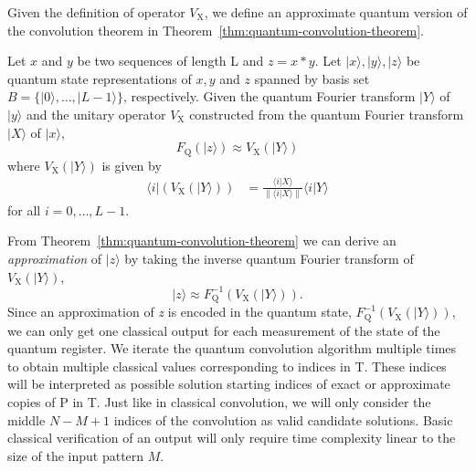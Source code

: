 Given the definition of operator $V_{\mathrm{X}}$, we define an approximate quantum version of the convolution theorem in Theorem~\ref{thm:quantum-convolution-theorem}.

\begin{theorem}\label{thm:quantum-convolution-theorem}
	Let $x$ and $y$ be two sequences of length L and $z = x \ast y$. Let $\vert x \rangle, \vert y \rangle, \vert z \rangle$ be quantum state representations of $x, y$ and $z$ spanned by basis set $B=\{\vert 0 \rangle,\ldots,\vert L-1 \rangle\}$, respectively. Given the quantum Fourier transform $\vert Y \rangle$ of $\vert y \rangle$ and the unitary operator $V_{\mathrm{X}}$ constructed from the quantum Fourier transform $\vert X \rangle$ of $\vert x \rangle$,
	\[
		F_{\mathrm{Q}}\left( \vert z \rangle \right) \approx V_{\mathrm{X}} \left(\vert Y \rangle\right)
	\]
where $V_{\mathrm{X}} \left(\vert Y \rangle\right)$ is given by
	\begin{equation*}
		\begin{split}
			\langle i \vert \left(V_{\mathrm{X}} \left(\vert Y \rangle\right)\right) &= \frac{\langle i \vert X \rangle}{\| \langle i \vert X \rangle \|} \langle i \vert Y \rangle
		\end{split}
	\end{equation*}
for all $i=0,\ldots,L-1$.
\end{theorem}
From Theorem~\ref{thm:quantum-convolution-theorem} we can derive an \textit{approximation} of $\vert z \rangle$ by taking the inverse quantum Fourier transform of $V_{\mathrm{X}} \left(\vert Y \rangle\right)$, 
\[
	\vert z \rangle \approx F_{\mathrm{Q}}^{-1}\left( V_{\mathrm{X}}\left( \vert Y \rangle \right) \right).
\]
Since an approximation of \textit{z} is encoded in the quantum state, $F_{\mathrm{Q}}^{-1}\left( V_{\mathrm{X}}\left( \vert Y \rangle \right) \right)$, we can only get one classical output for each measurement of the state of the quantum register. We iterate the quantum convolution algorithm multiple times to obtain multiple classical values corresponding to indices in T. These indices will be interpreted as possible solution starting indices of exact or approximate copies of P in T. Just like in classical convolution, we will only consider the middle $N-M+1$ indices of the convolution as valid candidate solutions. Basic classical verification of an output will only require time complexity linear to the size of the input pattern $M$.

